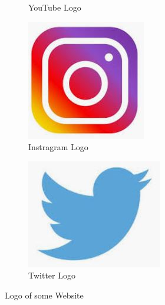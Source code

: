 \documentclass[12pt,a4paper]{article}
\begin{document}
\begin{figure}
\begin{subfigure}{.5\textwidth}
			\caption{YouTube Logo}
			\label{fig :Logo2}
		\end{subfigure}
		\begin{subfigure}{.5\textwidth}
			\includegraphics[width=\linewidth]{Instragram}
			\caption{Instragram Logo}
			\label{fig :Logo3}
		\end{subfigure}
		\begin{subfigure}{.5\textwidth}
			\includegraphics[width=\linewidth]{Twitter}
			\caption{Twitter Logo}
			\label{fig :Logo3}
		\end{subfigure}
		\caption{Logo of some Website}
		\label{Logos}
	\end{figure}
\end{document}
